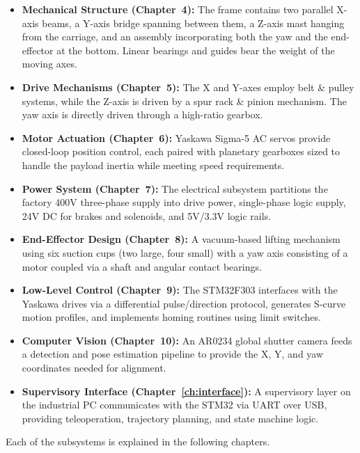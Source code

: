 \begin{itemize}
    \item \textbf{Mechanical Structure (Chapter~4):} The frame contains two parallel X-axis beams, a Y-axis bridge spanning between them, a Z-axis mast hanging from the carriage, and an assembly incorporating both the yaw and the end-effector at the bottom. Linear bearings and guides bear the weight of the moving axes.
    \item \textbf{Drive Mechanisms (Chapter~5):} The X and Y-axes employ belt \& pulley systems, while the Z-axis is driven by a spur rack \& pinion mechanism. The yaw axis is directly driven through a high-ratio gearbox.
    \item \textbf{Motor Actuation (Chapter~6):} Yaskawa Sigma-5 AC servos provide closed-loop position control, each paired with planetary gearboxes sized to handle the payload inertia while meeting speed requirements.
    \item \textbf{Power System (Chapter~7):} The electrical subsystem partitions the factory 400V three-phase supply into drive power, single-phase logic supply, 24V DC for brakes and solenoids, and 5V/3.3V logic rails.
    \item \textbf{End-Effector Design (Chapter~8):} A vacuum-based lifting mechanism using six suction cups (two large, four small) with a yaw axis consisting of a motor coupled via a shaft and angular contact bearings.
    \item \textbf{Low-Level Control (Chapter~9):} The STM32F303 interfaces with the Yaskawa drives via a differential pulse/direction protocol, generates S-curve motion profiles, and implements homing routines using limit switches.
    \item \textbf{Computer Vision (Chapter~10):} An AR0234 global shutter camera feeds a detection and pose estimation pipeline to provide the X, Y, and yaw coordinates needed for alignment.
    \item \textbf{Supervisory Interface (Chapter~\ref{ch:interface}):} A supervisory layer on the industrial PC communicates with the STM32 via UART over USB, providing teleoperation, trajectory planning, and state machine logic.
\end{itemize}

Each of the subsystems is explained in the following chapters.